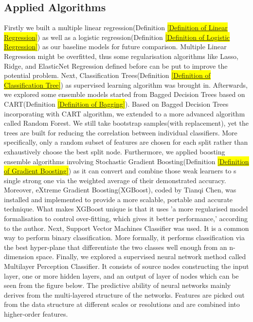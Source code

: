 \subsection{Applied Algorithms}
Firstly we built a multiple linear regression(Definition \hl{\ref{Definition of Linear Regression}}) as well as a logistic regression(Definition \hl{\ref{Definition of Logistic Regression}}) as our baseline models for future comparison. Multiple Linear Regression might be overfitted, thus some regularisation algorithms like Lasso, Ridge, and ElasticNet Regression defined before can be put to improve the potential problem. Next, Classification Trees(Definition \hl{\ref{Definition of Classification Tree}}) as supervised learning algorithm was brought in. Afterwards, we explored some ensemble models started from Bagged Decision Trees based on CART(Definition \hl{\ref{Definition of Bagging}}). Based on Bagged Decision Trees incorporating with CART algorithm, we extended to a more advanced algorithm called Random Forest. We still take bootstrap samples(with replacement), yet the trees are built for reducing the correlation between individual classifiers. More specifically, only a random subset of features are chosen for each split rather than exhaustively choose the best split node. Furthermore, we applied boosting ensemble algorithms involving Stochastic Gradient Boosting(Definition \hl{\ref{Definition of Gradient Boosting}}) as it can convert and combine those weak learners to s single strong one via the weighted average of their demonstrated accuracy.   Moreover, eXtreme Gradient Boosting(XGBoost), coded by Tianqi Chen, was installed and implemented to provide a more scalable, portable and accurate technique. What makes XGBoost unique is that it uses 'a more regularised model formalisation to control over-fitting, which gives it better performance,' according to the author. Next, Support Vector Machines Classifier was used. It is a common way to perform binary classification. More formally, it performs classification via the best hyper-plane that differentiate the two classes well enough from an n-dimension space. Finally, we explored a supervised neural network method called Multilayer Perception Classifier. It consists of source nodes constructing the input layer, one or more hidden layers, and an output of layer of nodes which can be seen from the figure below. The predictive ability of neural networks mainly derives from the multi-layered structure of the networks. Features are picked out from the data structure at different scales or resolutions and are combined into higher-order features. 
